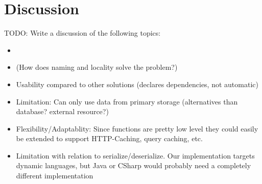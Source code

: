 

\section{Discussion}
\label{sec:cachable-function-discussion}

TODO: Write a discussion of the following topics:

\begin{itemize}
  \item
  \item (How does naming and locality solve the problem?)
  \item Usability compared to other solutions (declares dependencies, not automatic)
  \item Limitation: Can only use data from primary storage (alternatives than database? external resource?)
  \item Flexibility/Adaptablity: Since functions are pretty low level they could easily be extended to support HTTP-Caching, query caching, etc.
  \item Limitation with relation to serialize/deserialize. Our implementation targets dynamic languages, but Java or CSharp would probably need a completely different implementation
\end{itemize}



